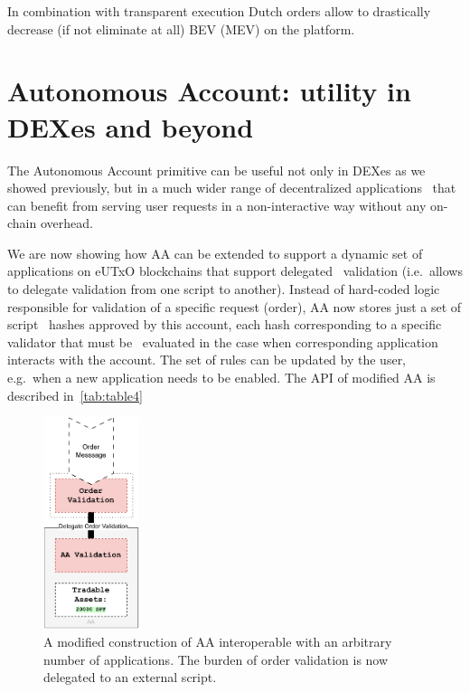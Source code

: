 \documentclass[11pt]{article}
\begin{document}
\begin{sloppypar}
        In combination with transparent execution Dutch orders allow to drastically decrease (if not eliminate at all) BEV (MEV) on the platform.

        \newpage


        \section{Autonomous Account: utility in DEXes and beyond}\label{sec:autonomous-account}
        The Autonomous Account primitive can be useful not only in DEXes as we showed previously, but in a much wider range of decentralized applications \
        that can benefit from serving user requests in a non-interactive way without any on-chain overhead.

        We are now showing how AA can be extended to support a dynamic set of applications on eUTxO blockchains that support delegated \
        validation (i.e.\ allows to delegate validation from one script to another).
        Instead of hard-coded logic responsible for validation of a specific request (order), AA now stores just a set of script \
        hashes approved by this account, each hash corresponding to a specific validator that must be \
        evaluated in the case when corresponding application interacts with the account.
        The set of rules can be updated by the user, e.g.\ when a new application needs to be enabled.
        The API of modified AA is described in~\ref{tab:table4}

        \begin{figure}[h!]
            \centering
            \includegraphics[width=0.25\textwidth]{val_delegation}
            \caption{A modified construction of AA interoperable with an arbitrary number of applications.
            The burden of order validation is now delegated to an external script.}
            \label{fig:figure5}
        \end{figure}


\end{sloppypar}
\end{document}
